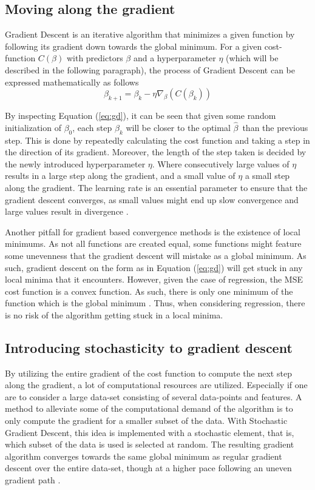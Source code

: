 \documentclass
[twocolumn,
secnumarabic,
nobibnotes,
aps,
prl,
reprint,
groupedaddress,
amsmath,
amssymb
]{revtex4-2}
\begin{document}
\subsection{Moving along the gradient}
Gradient Descent is an iterative algorithm that minimizes a given function by following its gradient down towards the global minimum. For a given cost-function $C(\beta)$ with predictors $\beta$ and a hyperparameter $\eta$ (which will be described in the following paragraph), the process of Gradient Descent can be expressed mathematically as follows
\begin{equation}
  \label{eq:gd}
  \beta_{k+1} = \beta_k - \eta\nabla_\beta\left(C(\beta_k)\right)
\end{equation}

By inspecting Equation (\ref{eq:gd}), it can be seen that given some random initialization of $\beta_0$, each step $\beta_k$ will be closer to the optimal $\hat{\beta}$ than the previous step. This is done by repeatedly calculating the cost function and taking a step in the direction of its gradient. Moreover, the length of the step taken is decided by the newly introduced hyperparameter $\eta$. Where consecutively large values of $\eta$ results in a large step along the gradient, and a small value of $\eta$ a small step along the gradient. The learning rate is an essential parameter to ensure that the gradient descent converges, as small values might end up slow convergence and large values result in divergence \cite{Geron2019}.

Another pitfall for gradient based convergence methods is the existence of local minimums. As not all functions are created equal, some functions might feature some unevenness that the gradient descent will mistake as a global minimum. As such, gradient descent on the form as in Equation (\ref{eq:gd}) will get stuck in any local minima that it encounters. However, given the case of regression, the MSE cost function is a convex function. As such, there is only one minimum of the function which is the global minimum \cite{Geron2019}. Thus, when considering regression, there is no risk of the algorithm getting stuck in a local minima.

\subsection{Introducing stochasticity to gradient descent}
By utilizing the entire gradient of the cost function to compute the next step along the gradient, a lot of computational resources are utilized. Especially if one are to consider a large data-set consisting of several data-points and features. A method to alleviate some of the computational demand of the algorithm is to only compute the gradient for a smaller subset of the data. With Stochastic Gradient Descent, this idea is implemented with a stochastic element, that is, which subset of the data is used is selected at random. The resulting gradient algorithm converges towards the same global minimum as regular gradient descent over the entire data-set, though at a higher pace following an uneven gradient path \cite{Geron2019}.
\end{document}
